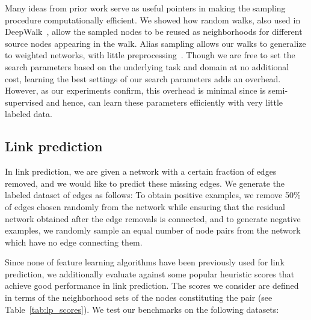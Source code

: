Many ideas from prior work serve as useful pointers in making the sampling procedure computationally efficient. We showed how random walks, also used in DeepWalk~\cite{deepwalk}, allow the sampled nodes to be reused as neighborhoods for different source nodes appearing in the walk. Alias sampling allows our walks to generalize to weighted networks, with little preprocessing~\cite{line}. Though we are free to set the search parameters based on the underlying task and domain at no additional cost, learning the best settings of our search parameters adds an overhead. However, as our experiments confirm, this overhead is minimal since \nodevec is semi-supervised and hence, can learn these parameters efficiently with very little labeled data. 


\subsection{Link prediction}
In link prediction, we are given a network with a certain fraction of edges removed, and we would like to predict these missing edges. We generate the labeled dataset of edges as follows: To obtain positive examples, we remove 50\% of edges chosen randomly from the network while ensuring that the residual network obtained after the edge removals is connected, and to generate negative examples, we randomly sample an equal number of node pairs from the network which have no edge connecting them. %

Since none of feature learning algorithms have been previously used for link prediction, we additionally evaluate \nodevec against some popular heuristic scores that achieve good performance in link prediction. The scores we consider are defined in terms of the neighborhood sets of the nodes constituting the pair (see Table~\ref{tab:lp_scores}). We test our benchmarks on the following datasets:

